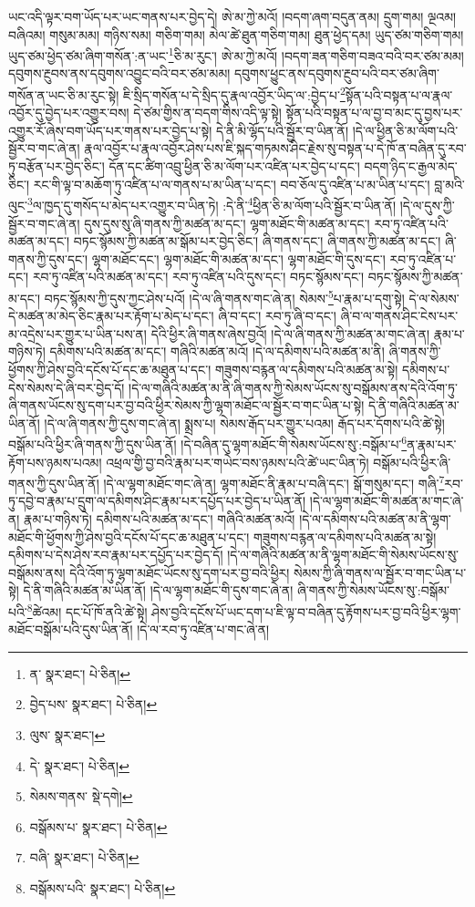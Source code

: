 ཡང་འདི་ལྟར་བག་ཡོད་པར་ཡང་གནས་པར་བྱེད་དེ། ཨེ་མ་ཀྱེ་མའོ། །བདག་ཞག་བདུན་ནམ། དྲུག་གམ། ལྔའམ། བཞིའམ། གསུམ་མམ། གཉིས་སམ། གཅིག་གམ། མེལ་ཚེ་ཐུན་གཅིག་གམ། ཐུན་ཕྱེད་དམ། ཡུད་ཙམ་གཅིག་གམ། ཡུད་ཙམ་ཕྱེད་ཙམ་ཞིག་གསོན་:ན་ཡང་\footnote{ན་  སྣར་ཐང་།  པེ་ཅིན། }ཅི་མ་རུང་། ཨེ་མ་ཀྱེ་མའོ། །བདག་ཟན་གཅིག་བཟའ་བའི་བར་ཙམ་མམ། དབུགས་རྔུབས་ནས་དབུགས་འབྱུང་བའི་བར་ཙམ་མམ། དབུགས་ཕྱུང་ནས་དབུགས་རྔུབ་པའི་བར་ཙམ་ཞིག་གསོན་ན་ཡང་ཅི་མ་རུང་སྟེ། ཇི་སྲིད་གསོན་པ་དེ་སྲིད་དུ་རྣལ་འབྱོར་ཡིད་ལ་:བྱེད་པ་\footnote{བྱེད་པས་  སྣར་ཐང་།  པེ་ཅིན། }སྟོན་པའི་བསྟན་པ་ལ་རྣལ་འབྱོར་དུ་བྱེད་པར་འགྱུར་བས། དེ་ཙམ་གྱིས་ན་བདག་གིས་འདི་ལྟ་སྟེ། སྟོན་པའི་བསྟན་པ་ལ་བྱ་བ་མང་དུ་བྱས་པར་འགྱུར་རོ་ཞེས་བག་ཡོད་པར་གནས་པར་བྱེད་པ་སྟེ། དེ་ནི་མི་ལྷོད་པའི་སྦྱོར་བ་ཡིན་ནོ། །དེ་ལ་ཕྱིན་ཅི་མ་ལོག་པའི་སྦྱོར་བ་གང་ཞེ་ན། རྣལ་འབྱོར་པ་རྣལ་འབྱོར་ཤེས་པས་ཇི་སྐད་གཏམས་ཤིང་རྗེས་སུ་བསྟན་པ་དེ་ཁོ་ན་བཞིན་དུ་རབ་ཏུ་བརྩོན་པར་བྱེད་ཅིང་། དོན་དང་ཚིག་འབྲུ་ཕྱིན་ཅི་མ་ལོག་པར་འཛིན་པར་བྱེད་པ་དང་། བདག་ཉིད་ང་རྒྱལ་མེད་ཅིང་། རང་གི་ལྟ་བ་མཆོག་ཏུ་འཛིན་པ་ལ་གནས་པ་མ་ཡིན་པ་དང་། བབ་ཅོལ་དུ་འཛིན་པ་མ་ཡིན་པ་དང་། བླ་མའི་ལུང་\footnote{ལུས་  སྣར་ཐང་། }ལ་ཁྱད་དུ་གསོད་པ་མེད་པར་འགྱུར་བ་ཡིན་ཏེ། :དེ་ནི་\footnote{དེ་  སྣར་ཐང་།  པེ་ཅིན། }ཕྱིན་ཅི་མ་ལོག་པའི་སྦྱོར་བ་ཡིན་ནོ། །དེ་ལ་དུས་ཀྱི་སྦྱོར་བ་གང་ཞེ་ན། དུས་དུས་སུ་ཞི་གནས་ཀྱི་མཚན་མ་དང་། ལྷག་མཐོང་གི་མཚན་མ་དང་། རབ་ཏུ་འཛིན་པའི་མཚན་མ་དང་། བཏང་སྙོམས་ཀྱི་མཚན་མ་སྒོམ་པར་བྱེད་ཅིང་། ཞི་གནས་དང་། ཞི་གནས་ཀྱི་མཚན་མ་དང་། ཞི་གནས་ཀྱི་དུས་དང་། ལྷག་མཐོང་དང་། ལྷག་མཐོང་གི་མཚན་མ་དང་། ལྷག་མཐོང་གི་དུས་དང་། རབ་ཏུ་འཛིན་པ་དང་། རབ་ཏུ་འཛིན་པའི་མཚན་མ་དང་། རབ་ཏུ་འཛིན་པའི་དུས་དང་། བཏང་སྙོམས་དང་། བཏང་སྙོམས་ཀྱི་མཚན་མ་དང་། བཏང་སྙོམས་ཀྱི་དུས་ཀྱང་ཤེས་པའོ། །དེ་ལ་ཞི་གནས་གང་ཞེ་ན། སེམས་\footnote{སེམས་གནས་  སྡེ་དགེ། }པ་རྣམ་པ་དགུ་སྟེ། དེ་ལ་སེམས་དེ་མཚན་མ་མེད་ཅིང་རྣམ་པར་རྟོག་པ་མེད་པ་དང་། ཞི་བ་དང་། རབ་ཏུ་ཞི་བ་དང་། ཞི་བ་ལ་གནས་ཤིང་ངེས་པར་མ་འདྲེས་པར་གྱུར་པ་ཡིན་པས་ན། དེའི་ཕྱིར་ཞི་གནས་ཞེས་བྱའོ། །དེ་ལ་ཞི་གནས་ཀྱི་མཚན་མ་གང་ཞེ་ན། རྣམ་པ་གཉིས་ཏེ། དམིགས་པའི་མཚན་མ་དང་། གཞིའི་མཚན་མའོ། །དེ་ལ་དམིགས་པའི་མཚན་མ་ནི། ཞི་གནས་ཀྱི་ཕྱོགས་ཀྱི་ཤེས་བྱའི་དངོས་པོ་དང་ཆ་མཐུན་པ་དང་། གཟུགས་བརྙན་ལ་དམིགས་པའི་མཚན་མ་སྟེ། དམིགས་པ་དེས་སེམས་དེ་ཞི་བར་བྱེད་དོ། །དེ་ལ་གཞིའི་མཚན་མ་ནི་ཞི་གནས་ཀྱི་སེམས་ཡོངས་སུ་བསྒོམས་ནས་དེའི་འོག་ཏུ་ཞི་གནས་ཡོངས་སུ་དག་པར་བྱ་བའི་ཕྱིར་སེམས་ཀྱི་ལྷག་མཐོང་ལ་སྦྱོར་བ་གང་ཡིན་པ་སྟེ། དེ་ནི་གཞིའི་མཚན་མ་ཡིན་ནོ། །དེ་ལ་ཞི་གནས་ཀྱི་དུས་གང་ཞེ་ན། སྨྲས་པ། སེམས་རྒོད་པར་གྱུར་པའམ། རྒོད་པར་དོགས་པའི་ཚེ་སྟེ། བསྒོམ་པའི་ཕྱིར་ཞི་གནས་ཀྱི་དུས་ཡིན་ནོ། །དེ་བཞིན་དུ་ལྷག་མཐོང་གི་སེམས་ཡོངས་སུ་:བསྒོམ་པ་\footnote{བསྒོམས་པ་  སྣར་ཐང་།  པེ་ཅིན། }ན་རྣམ་པར་རྟོག་པས་ཉམས་པའམ། འཕྲལ་གྱི་བྱ་བའི་རྣམ་པར་གཡེང་བས་ཉམས་པའི་ཚེ་ཡང་ཡིན་ཏེ། བསྒོམ་པའི་ཕྱིར་ཞི་གནས་ཀྱི་དུས་ཡིན་ནོ། །དེ་ལ་ལྷག་མཐོང་གང་ཞེ་ན། ལྷག་མཐོང་ནི་རྣམ་པ་བཞི་དང་། སྒོ་གསུམ་དང་། གཞི་\footnote{བཞི་  སྣར་ཐང་།  པེ་ཅིན། }རབ་ཏུ་དབྱེ་བ་རྣམ་པ་དྲུག་ལ་དམིགས་ཤིང་རྣམ་པར་དཔྱོད་པར་བྱེད་པ་ཡིན་ནོ། །དེ་ལ་ལྷག་མཐོང་གི་མཚན་མ་གང་ཞེ་ན། རྣམ་པ་གཉིས་ཏེ། དམིགས་པའི་མཚན་མ་དང་། གཞིའི་མཚན་མའོ། །དེ་ལ་དམིགས་པའི་མཚན་མ་ནི་ལྷག་མཐོང་གི་ཕྱོགས་ཀྱི་ཤེས་བྱའི་དངོས་པོ་དང་ཆ་མཐུན་པ་དང་། གཟུགས་བརྙན་ལ་དམིགས་པའི་མཚན་མ་སྟེ། དམིགས་པ་དེས་ཤེས་རབ་རྣམ་པར་དཔྱོད་པར་བྱེད་དོ། །དེ་ལ་གཞིའི་མཚན་མ་ནི་ལྷག་མཐོང་གི་སེམས་ཡོངས་སུ་བསྒོམས་ནས། དེའི་འོག་ཏུ་ལྷག་མཐོང་ཡོངས་སུ་དག་པར་བྱ་བའི་ཕྱིར། སེམས་ཀྱི་ཞི་གནས་ལ་སྦྱོར་བ་གང་ཡིན་པ་སྟེ། དེ་ནི་གཞིའི་མཚན་མ་ཡིན་ནོ། །དེ་ལ་ལྷག་མཐོང་གི་དུས་གང་ཞེ་ན། ཞི་གནས་ཀྱི་སེམས་ཡོངས་སུ་:བསྒོམ་པའི་\footnote{བསྒོམས་པའི་  སྣར་ཐང་།  པེ་ཅིན། }ཚེའམ། དང་པོ་ཁོ་ནའི་ཚེ་སྟེ། ཤེས་བྱའི་དངོས་པོ་ཡང་དག་པ་ཇི་ལྟ་བ་བཞིན་དུ་རྟོགས་པར་བྱ་བའི་ཕྱིར་ལྷག་མཐོང་བསྒོམ་པའི་དུས་ཡིན་ནོ། །དེ་ལ་རབ་ཏུ་འཛིན་པ་གང་ཞེ་ན། 